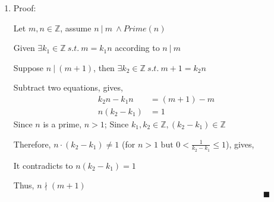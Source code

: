 \documentclass[12pt]{article}
\begin{document}
\begin{enumerate}[label=(\alph*)]
	\item Proof:

Let $m, n \in \mathbb{Z}$, assume $n\ |\ m\ \wedge Prime(n)$

Given $\exists k_1 \in \mathbb{Z}\ s.t.\ m=k_1n$ according to $n\ | \ m$

Suppose $n \ | \ (m+1)$, then $\exists k_2 \in \mathbb{Z}\ s.t.\ m+1 = k_2n$

Subtract two equations, gives, 
\begin{align*}
	k_2n - k_1n &= (m+1) - m \\
	n(k_2 - k_1) &= 1
\end{align*}
Since $n$ is a prime, $n > 1$; Since $k_1, k_2 \in \mathbb{Z}, (k_2 - k_1) \in \mathbb{Z}$

Therefore, $n \cdot (k_2 - k_1) \neq 1$ (for $n > 1 \text{ but } 0 < \frac{1}{k_2 - k_1}\leq 1 $), gives,

It contradicts to $n(k_2 - k_1) = 1$

Thus, $n \nmid (m + 1)$
$\quad \quad \quad \quad \quad \quad \quad \quad \quad \quad \quad \quad \quad \quad \quad \quad \quad \quad \quad \quad \quad \quad \quad \quad \quad \quad \quad \quad \quad \quad \blacksquare $
\end{enumerate}

\newpage
\end{document}
